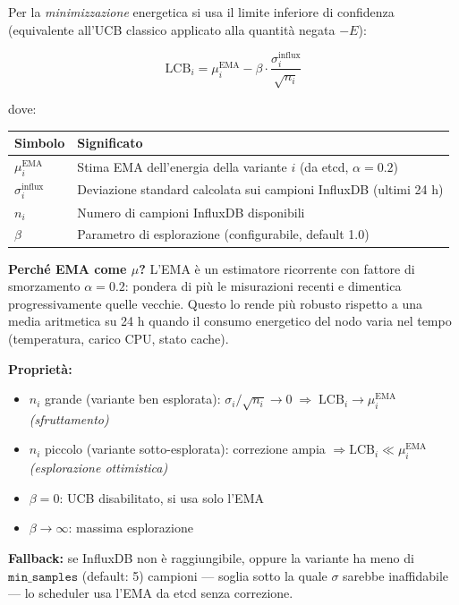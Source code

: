 \documentclass[a4paper,11pt]{article}
\begin{document}
Per la \textit{minimizzazione} energetica si usa il limite inferiore di confidenza
(equivalente all'UCB classico applicato alla quantità negata $-E$):

\[
  \text{LCB}_i = \mu^{\text{EMA}}_i
               - \beta \cdot \frac{\sigma^{\text{influx}}_i}{\sqrt{n_i}}
\]

dove:

\begin{table}[h!]
\centering
\small
\begin{tabular}{lp{10cm}}
\toprule
\textbf{Simbolo} & \textbf{Significato} \\
\midrule
$\mu^{\text{EMA}}_i$       & Stima EMA dell'energia della variante $i$
                              (da etcd, $\alpha = 0.2$) \\
$\sigma^{\text{influx}}_i$ & Deviazione standard calcolata sui campioni InfluxDB
                              (ultimi 24 h) \\
$n_i$                      & Numero di campioni InfluxDB disponibili \\
$\beta$                    & Parametro di esplorazione (configurabile, default 1.0) \\
\bottomrule
\end{tabular}
\end{table}

\medskip
\noindent\textbf{Perché EMA come $\mu$?}
L'EMA è un estimatore ricorrente con fattore di smorzamento $\alpha = 0.2$: pondera di
più le misurazioni recenti e dimentica progressivamente quelle vecchie. Questo lo rende
più robusto rispetto a una media aritmetica su 24 h quando il consumo energetico del
nodo varia nel tempo (temperatura, carico CPU, stato cache).

\medskip
\noindent\textbf{Proprietà:}
\begin{itemize}
  \item $n_i$ grande (variante ben esplorata):
    $\sigma_i / \sqrt{n_i} \to 0 \;\Rightarrow\;
    \text{LCB}_i \to \mu^{\text{EMA}}_i$ \emph{(sfruttamento)}
  \item $n_i$ piccolo (variante sotto-esplorata):
    correzione ampia $\Rightarrow \text{LCB}_i \ll \mu^{\text{EMA}}_i$
    \emph{(esplorazione ottimistica)}
  \item $\beta = 0$: UCB disabilitato, si usa solo l'EMA
  \item $\beta \to \infty$: massima esplorazione
\end{itemize}

\medskip
\noindent\textbf{Fallback:} se InfluxDB non è raggiungibile, oppure la variante ha
meno di $\texttt{min\_samples}$ (default: 5) campioni --- soglia sotto la quale
$\sigma$ sarebbe inaffidabile --- lo scheduler usa l'EMA da etcd senza correzione.
\end{document}
